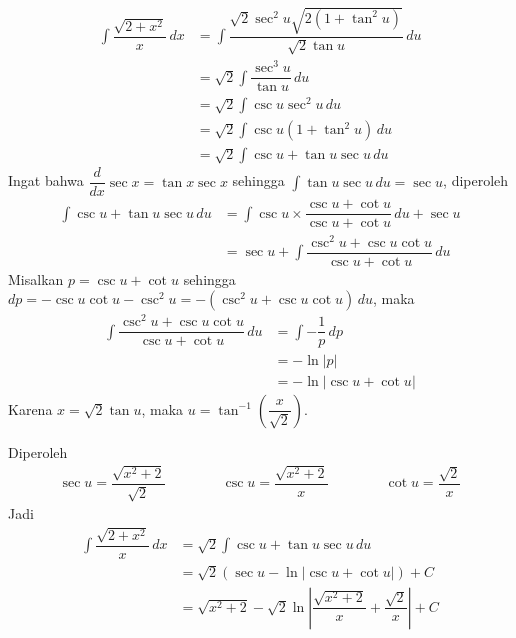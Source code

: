 \documentclass{article}
\begin{document}
\begin{enumerate}
\begin{align*}
	\int \dfrac{\sqrt{2+x^2}}{x}\, dx &= \int \dfrac{\sqrt{2}\sec^2 u\sqrt{2(1+\tan^2 u)}}{\sqrt{2}\tan u}\, du\\
	&= \sqrt{2}\int \dfrac{\sec^3 u}{\tan u}\, du\\
	&= \sqrt{2}\int \csc u\sec^2 u\, du\\
	&= \sqrt{2}\int \csc u(1+\tan^2u)\, du\\
	&= \sqrt{2}\int \csc u+\tan u\sec u\, du
	\end{align*}
	Ingat bahwa $\dfrac{d}{dx}\sec x = \tan x\sec x$ sehingga $\displaystyle \int \tan u \sec u\, du=\sec u$, diperoleh
	\begin{align*}
	\int \csc u+\tan u\sec u\, du &= \int \csc u\times \dfrac{\csc u+\cot u}{\csc u +\cot u}\, du +\sec u\\
	&= \sec u+ \int \dfrac{\csc^2 u+\csc u\cot u}{\csc u+\cot u} \, du
	\end{align*}
	Misalkan $p=\csc u+\cot u$ sehingga $dp = -\csc u\cot u-\csc^2u=-(\csc^2 u+\csc u\cot u) \, du$, maka
	\begin{align*}
	\int \dfrac{\csc^2 u+\csc u\cot u}{\csc u+\cot u} \, du &= \int -\dfrac{1}{p}\, dp\\
	&= -\ln|p| \\
	&= -\ln|\csc u+\cot u|
	\end{align*}
	Karena $x=\sqrt{2}\tan u$, maka $u=\tan^{-1}\left(\dfrac{x}{\sqrt{2}}\right)$. 
	\begin{center}
\end{center}	
Diperoleh 
\begin{align*}
\sec u = \dfrac{\sqrt{x^2+2}}{\sqrt{2}}\qquad\qquad
\csc u = \dfrac{\sqrt{x^2+2}}{x} \qquad \qquad\cot u = \dfrac{\sqrt{2}}{x}
\end{align*}
Jadi 
\begin{align*}
\int \dfrac{\sqrt{2+x^2}}{x}\, dx &=\sqrt{2}\int \csc u+\tan u\sec u\, du\\ 
&= \sqrt{2}(\sec u-\ln|\csc u+\cot u|)+C\\
&= \sqrt{x^2+2}-\sqrt{2}\ln\left|\dfrac{\sqrt{x^2+2}}{x}+\dfrac{\sqrt{2}}{x}\right|+C

\end{align*}
\end{enumerate}
\end{document}
